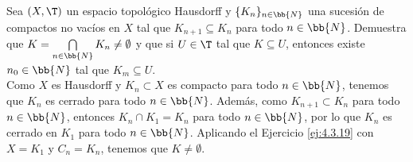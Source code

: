 \begin{ejercicio}
    Sea $(X, \T)$ un espacio topológico Hausdorff y $\{K_n\}_{n \in \bb{N}}$ una
    sucesión de compactos no vacíos en $X$ tal que $K_{n+1} \subseteq K_n$ para todo $n \in \bb{N}$.
    Demuestra que $K = \bigcap\limits_{n \in \bb{N}} K_n \neq \emptyset$
    y que si $U \in \T$ tal que $K \subseteq U$, entonces existe $n_0 \in \bb{N}$ tal que $K_m \subseteq U$.\\

    Como $X$ es Hausdorff y $K_n\subset X$ es compacto para todo $n\in \bb{N}$, 
    tenemos que $K_n$ es cerrado para todo $n\in \bb{N}$. Además, 
    como $K_{n+1}\subset K_n$ para todo $n\in \bb{N}$, entonces $K_n\cap K_1=K_n$
    para todo $n\in \bb{N}$, por lo que $K_n$ es cerrado en $K_1$ para todo $n\in \bb{N}$.
    Aplicando el Ejercicio \ref{ej:4.3.19} con $X=K_1$ y $C_n=K_n$,
    tenemos que $K\neq \emptyset$.
    
    \begin{comment}
    por lo que $X\setminus K_n\in \T$ es abierto para todo $n\in \bb{N}$, y por tanto
    $K_1\setminus K_n = K_1 \cap (X\setminus K_n)\in \T_{K_1}$ es abierto en $K_1$ para todo $n\in \bb{N}$.\\
    
    Supongamos ahora $K=\emptyset$. Entonces, tenemos que $\{K_1\setminus K_n\}_{n\in \bb{N}}$
    es un recubrimiento de $K_1$ por abiertos de $K_1$, ya que: 
    \begin{equation*}
        K_1 = K_1\setminus K
        = K_1 \setminus \left(\bigcap_{n\in \bb{N}} K_n\right)
        = \bigcup_{n\in \bb{N}} K_1\setminus K_n
    \end{equation*}    
    
    Como $K_1$ es compacto, existe un subconjunto finito $I_0\subset \bb{N}$ tal que $\{K_1\setminus K_n\}_{n\in I_0}$ es un subrecubrimiento de $K_1$:
    \begin{equation*}
        K_1 = \bigcup_{n\in I_0} K_1\setminus K_n
        = K_1\setminus \left(\bigcap_{n\in I_0} K_n\right)
    \end{equation*}
    Como $I_0$ es finito, sea $n_0=\max I_0$ y, como $K_{n+1}\subset K_n$ para todo $n\in \bb{N}$, entonces
    $K_{n_0} \subset K_n$ para todo $n\in I_0$, por lo que:
    \begin{equation*}
        K_1 = \bigcup_{n\in I_0} K_1\setminus K_n
        = K_1 \setminus \left(\bigcap_{n\in I_0} K_n\right)
        = K_1 \setminus K_{n_0}
    \end{equation*}


\end{comment}
\end{ejercicio}
